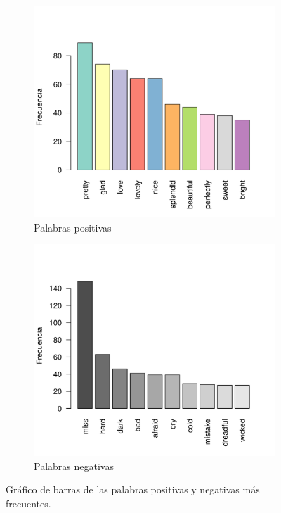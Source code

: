 \documentclass[12pt]{article}
\begin{document}
	\begin{figure}
		\begin{subfigure}{.5\textwidth}
			\centering
			\includegraphics[width = 0.9\linewidth]{palabras_positivas.png}
			\caption{Palabras positivas}
			\label{palabras_positivas}
		\end{subfigure}
		\begin{subfigure}{0.5\textwidth}
			\centering
			\includegraphics[width = 0.9\linewidth]{palabras_negativas.png}
			\caption{Palabras negativas}
			\label{palabras_negativas}
		\end{subfigure}
	
		\caption{Gráfico de barras de las palabras positivas y negativas más frecuentes.}
		\label{palabras_pos-neg}
	\end{figure}
	
\end{document}
